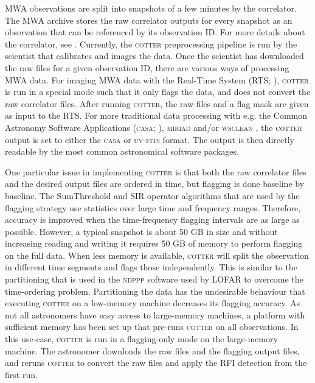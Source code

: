 \documentclass{pasa}
\begin{document}
MWA observations are split into snapshots of a few minutes by the correlator. The MWA archive stores the raw correlator outputs for every snapshot as an observation that can be referenced by its observation ID. For more details about the correlator, see \citet{ord-2014-mwa-fpga-gpu}. Currently, the \textsc{cotter} preprocessing pipeline is run by the scientist that calibrates and images the data. Once the scientist has downloaded the raw files for a given observation ID, there are various ways of processing MWA data. For imaging MWA data with the Real-Time System (RTS; \citealt{rts-mwa-2008}), \textsc{cotter} is run in a special mode such that it only flags the data, and does not convert the raw correlator files. After running \textsc{cotter}, the raw files and a flag mask are given as input to the RTS. For more traditional data processing with e.g. the Common Astronomy Software Applications (\textsc{casa}; \citealt{casa-2008}), \textsc{miriad} \citep{miriad-sault-1995} and/or \textsc{wsclean} \citep{offringa-wsclean-2014}, the \textsc{cotter} output is set to either the \textsc{casa} or \textsc{uv-fits} format. The output is then directly readable by the most common astronomical software packages. 

One particular issue in implementing \textsc{cotter} is that both the raw correlator files and the desired output files are ordered in time, but flagging is done baseline by baseline. The SumThreshold and SIR operator algorithms that are used by the flagging strategy use statistics over large time and frequency ranges. Therefore, accuracy is improved when the time-frequency flagging intervals are as large as possible. However, a typical snapshot is about 50 GB in size and without increasing reading and writing it requires 50 GB of memory to perform flagging on the full data. When less memory is available, \textsc{cotter} will split the observation in different time segments and flags those independently. This is similar to the partitioning that is used in the \textsc{ndppp} software used by LOFAR \citep{lofar-imaging-cookbook} to overcome the time-ordering problem. Partitioning the data has the undesirable behaviour that executing \textsc{cotter} on a low-memory machine decreases its flagging accuracy. As not all astronomers have easy access to large-memory machines, a platform with sufficient memory has been set up that pre-runs \textsc{cotter} on all observations. In this use-case, \textsc{cotter} is run in a flagging-only mode on the large-memory machine. The astronomer downloads the raw files and the flagging output files, and reruns \textsc{cotter} to convert the raw files and apply the RFI detection from the first run.
\end{document}
